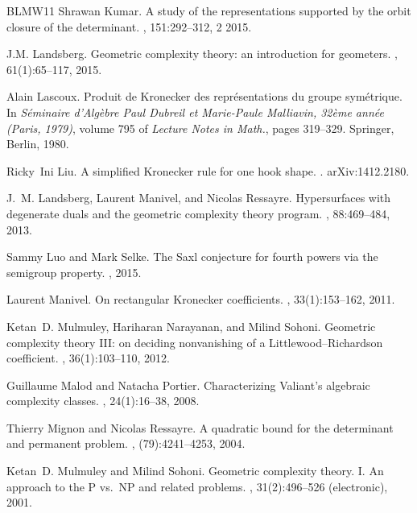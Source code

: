 \documentclass{article}
\numberwithin{equation}{section}
\theoremstyle{definition}
\begin{document}
\begin{thebibliography}{BLMW11}
Shrawan Kumar.
\newblock A study of the representations supported by the orbit closure of the
  determinant.
, 151:292--312, 2 2015.

J.M. Landsberg.
\newblock Geometric complexity theory: an introduction for geometers.
, 61(1):65--117, 2015.

Alain Lascoux.
\newblock Produit de {K}ronecker des repr\'esentations du groupe sym\'etrique.
\newblock In {\em S\'eminaire d'Alg\`ebre Paul Dubreil et Marie-Paule
  Malliavin, 32\`eme ann\'ee (Paris, 1979)}, volume 795 of {\em Lecture Notes
  in Math.}, pages 319--329. Springer, Berlin, 1980.

Ricky~Ini Liu.
\newblock A simplified {K}ronecker rule for one hook shape.
.
\newblock arXiv:1412.2180.

J.~M. Landsberg, Laurent Manivel, and Nicolas Ressayre.
\newblock Hypersurfaces with degenerate duals and the geometric complexity
  theory program.
, 88:469--484, 2013.

Sammy Luo and Mark Selke.
\newblock The {S}axl conjecture for fourth powers via the semigroup property.
, 2015.

Laurent Manivel.
\newblock On rectangular {K}ronecker coefficients.
, 33(1):153--162, 2011.

Ketan~D. Mulmuley, Hariharan Narayanan, and Milind Sohoni.
\newblock Geometric complexity theory {III}: on deciding nonvanishing of a
  {L}ittlewood--{R}ichardson coefficient.
, 36(1):103--110, 2012.

Guillaume Malod and Natacha Portier.
\newblock Characterizing {V}aliant's algebraic complexity classes.
, 24(1):16--38, 2008.

Thierry Mignon and Nicolas Ressayre.
\newblock A quadratic bound for the determinant and permanent problem.
, (79):4241--4253, 2004.

Ketan~D. Mulmuley and Milind Sohoni.
\newblock Geometric complexity theory. {I}. {A}n approach to the {P} vs.\ {NP}
  and related problems.
, 31(2):496--526 (electronic), 2001.


\end{thebibliography}
\end{document}
